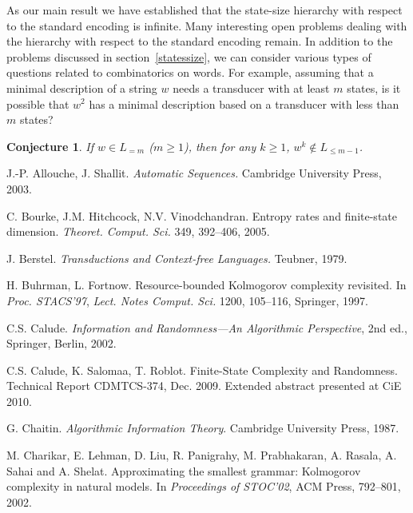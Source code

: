\documentclass[copyright]{eptcs}
\newtheorem{conjecture}[theorem]{Conjecture}
\begin{document}
As our main result we have established that the state-size hierarchy
with respect to the standard encoding is infinite.
Many interesting open problems dealing with the hierarchy
with respect to the standard encoding remain. In addition to the problems
discussed in section~\ref{statessize}, we can consider various types
of questions related to combinatorics on words. For example,
assuming that a minimal description of a string $w$ needs a transducer
with at least $m$ states, is it possible that $w^2$ has a minimal
description based on a transducer with less than $m$ states?

\begin{conjecture}
If $w \in L_{=m}$ ($m \geq 1$), then for any $k \geq 1$,
$w^k \not\in L_{\leq m-1}$.
\end{conjecture}

{\small
\begin{thebibliography}{99}

 J.-P. Allouche, J. Shallit.
{\em Automatic Sequences.} Cambridge University Press, 2003.





 C. Bourke, J.M. Hitchcock,
N.V. Vinodchandran. Entropy rates and finite-state
dimension.
{\em Theoret. Comput. Sci.} 349, 392--406, 2005.

 J. Berstel.
{\em Transductions and Context-free Languages.}
Teubner, 1979.

  H. Buhrman, L. Fortnow. Resource-bounded Kolmogorov complexity
revisited. In {\em  Proc. STACS'97}, {\em Lect. Notes Comput.
Sci.} 1200, 105--116, Springer, 1997.

C.S. Calude.
{\em Information and Randomness---An Algorithmic Perspective}, 2nd
 ed., Springer, Berlin, 2002. 


 C.S. Calude, K. Salomaa, T. Roblot.
Finite-State Complexity and Randomness. 
Technical Report CDMTCS-374, Dec. 2009. Extended
abstract presented at CiE 2010.



 G. Chaitin. {\em Algorithmic Information Theory}. 
Cambridge 
University Press, 1987.

 M. Charikar, E. Lehman, D. Liu, R. Panigrahy,
M. Prabhakaran, A. Rasala, A. Sahai and A. Shelat.
Approximating the smallest grammar: Kolmogorov complexity in natural
models. In {\em  Proceedings of STOC'02}, ACM Press,   792--801, 2002.











\end{thebibliography}}
\end{document}
